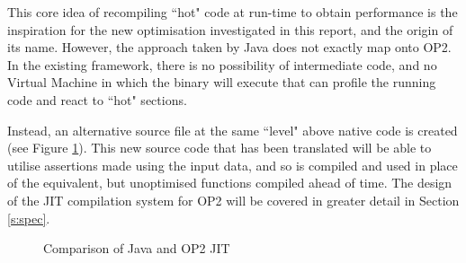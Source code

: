 This core idea of recompiling ``hot" code at run-time to obtain performance is the inspiration for the new optimisation investigated in this report, and the origin of its name. However, the approach taken by Java does not exactly map onto OP2. In the existing framework, there is no possibility of intermediate code, and no Virtual Machine in which the binary will execute that can profile the running code and react to ``hot" sections.
\par
Instead, an alternative source file at the same ``level" above native code is created (see Figure \ref{fig:jit_compare}). This new source code that has been translated will be able to utilise assertions made using the input data, and so is compiled and used in place of the equivalent, but unoptimised functions compiled ahead of time. The design of the JIT compilation system for OP2 will be covered in greater detail in Section \ref{s:spec}.
\begin{figure}[h!]
  \vspace{2em}

  \caption{Comparison of Java and OP2 JIT}
  \label{fig:jit_compare}
\end{figure}

